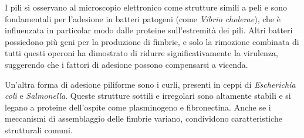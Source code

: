 \documentclass[../main.tex]{subfiles}
\begin{document}
I pili si osservano al microscopio elettronico come strutture simili a peli e sono fondamentali per l’adesione in batteri patogeni (come \textit{Vibrio cholerae}), che è influenzata in particolar modo dalle proteine sull'estremità dei pili.\cite{fallman_2005} Altri batteri possiedono più geni per la produzione di fimbrie, e solo la rimozione combinata di tutti questi operoni ha dimostrato di ridurre significativamente la virulenza, suggerendo che i fattori di adesione possono compensarsi a vicenda.

Un’altra forma di adesione piliforme sono i curli, presenti in ceppi di \textit{Escherichia coli} e \textit{Salmonella}.\cite{kenny_1997} Queste strutture sottili e irregolari sono altamente stabili e si legano a proteine dell’ospite come plasminogeno e fibronectina. Anche se i meccanismi di assemblaggio delle fimbrie variano, condividono caratteristiche strutturali comuni.\cite{soto_1999}\smallskip
\end{document}
